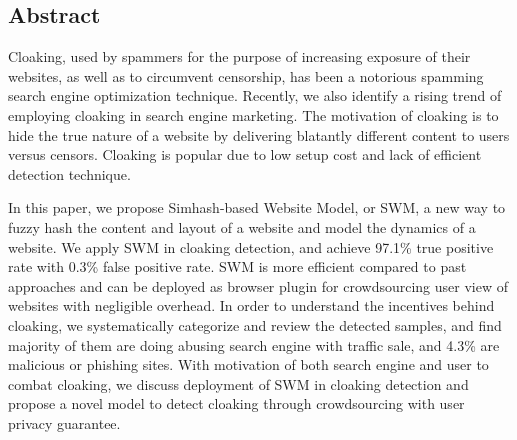 
\subsection*{Abstract}
Cloaking, used by spammers for the purpose of increasing exposure of
their websites, as well as to circumvent censorship, has been a notorious 
spamming search engine optimization technique. Recently, we also
identify a rising trend of employing cloaking in search engine marketing. The motivation of cloaking 
is to hide the true nature of a website by delivering blatantly different 
content to users versus censors. Cloaking is popular due to low setup cost 
and lack of efficient detection technique. 

In this paper, we propose Simhash-based Website Model, or SWM, a new way to
fuzzy hash the content and layout of a
website and model the dynamics of a website. 
We apply SWM in cloaking detection, and achieve 97.1\% true positive rate with
0.3\% false positive rate. 
SWM is more efficient compared to past approaches and can be deployed as browser
plugin for crowdsourcing user view of websites with negligible overhead.
In order to understand the incentives
behind cloaking, we systematically
categorize and review the detected samples, and find majority of them are
doing abusing search engine with traffic sale, and 4.3\% are 
malicious or phishing sites.
With motivation of both search engine and user to combat cloaking, we discuss
deployment of SWM in cloaking detection and
propose a novel model to
detect cloaking through crowdsourcing with user privacy guarantee.

